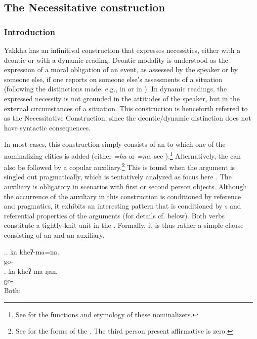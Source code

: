 \subsection{The Necessitative construction}\label{obl}

\subsubsection{Introduction}
Yakkha has an infinitival construction that expresses necessities, either with a deontic or with a dynamic reading. Deontic modality is understood as the expression of a moral obligation of an event, as assessed by the speaker or by someone else, if one reports on someone else's assessments of a situation (following the distinctions made, e.g., in \citealt[2]{Nuyts2006_Modality} or in \citealt[12]{Vanlinden2012_Modal}). In  dynamic readings, the expressed necessity is not grounded in the attitudes of the speaker, but in the external circumstances of a situation.  This construction is henceforth referred to as the Necessitative Construction, since the deontic/dynamic distinction does not have syntactic consequences.

In most cases, this construction simply consists of an   to which one of the nominalizing clitics is added (either \emph{=ha} or \emph{=na}, see \Next[a]).\footnote{See  for the functions and etymology of these nominalizers.}  Alternatively, the  can also be followed by a copular auxiliary.\footnote{See  for the forms of the . The third person present affirmative is zero.} This is found when the argument is singled out pragmatically, which is tentatively analyzed as focus here \Next[b]. The auxiliary is obligatory in scenarios with first or second person objects. Although the occurrence of the auxiliary in this construction is conditioned by reference and pragmatics, it exhibits an interesting  pattern that is conditioned by s and referential properties of the arguments (for details cf. below). Both verbs constitute a tightly-knit unit in the . Formally,  it is thus rather a simple clause consisting of an  and an auxiliary. 

\ex.\ag. ka kheʔ-ma=na.\\
 go- \\
\bg. ka kheʔ-ma ŋan.\\
 go-  \\
Both:  


